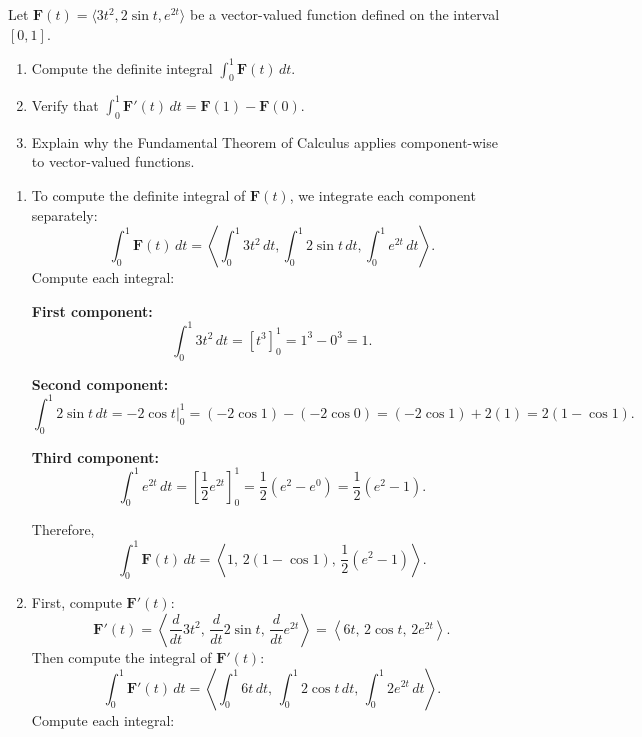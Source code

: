 \exampleline
\begin{example}
Let \(\mathbf{F}(t) = \langle 3t^2, 2\sin t, e^{2t} \rangle\) be a vector-valued function defined on the interval \( [0, 1] \).

\begin{enumerate}
    \item Compute the definite integral \(\displaystyle \int_0^1 \mathbf{F}(t) \, dt\).
    \item Verify that \(\displaystyle \int_0^1 \mathbf{F}'(t) \, dt = \mathbf{F}(1) - \mathbf{F}(0)\).
    \item Explain why the Fundamental Theorem of Calculus applies component-wise to vector-valued functions.
\end{enumerate}

\begin{solution}
\begin{enumerate}
    \item To compute the definite integral of \(\mathbf{F}(t)\), we integrate each component separately:
    \[
    \int_0^1 \mathbf{F}(t) \, dt = \left\langle \int_0^1 3t^2 \, dt, \int_0^1 2\sin t \, dt, \int_0^1 e^{2t} \, dt \right\rangle.
    \]
    Compute each integral:

    \textbf{First component:}
    \[
    \int_0^1 3t^2 \, dt = \left[ t^3 \right]_0^1 = 1^3 - 0^3 = 1.
    \]

    \textbf{Second component:}
    \[
    \int_0^1 2\sin t \, dt = -2\cos t \bigg|_0^1 = \left( -2\cos 1 \right) - \left( -2\cos 0 \right) = (-2\cos 1) + 2(1) = 2(1 - \cos 1).
    \]

    \textbf{Third component:}
    \[
    \int_0^1 e^{2t} \, dt = \left[ \frac{1}{2} e^{2t} \right]_0^1 = \frac{1}{2} \left( e^{2} - e^{0} \right) = \frac{1}{2} (e^{2} - 1).
    \]

    Therefore,
    \[
    \int_0^1 \mathbf{F}(t) \, dt = \left\langle 1, \, 2(1 - \cos 1), \, \dfrac{1}{2}(e^{2} - 1) \right\rangle.
    \]

    \item First, compute \(\mathbf{F}'(t)\):
    \[
    \mathbf{F}'(t) = \left\langle \frac{d}{dt} 3t^2, \, \frac{d}{dt} 2\sin t, \, \frac{d}{dt} e^{2t} \right\rangle = \left\langle 6t, \, 2\cos t, \, 2e^{2t} \right\rangle.
    \]
    Then compute the integral of \(\mathbf{F}'(t)\):
    \[
    \int_0^1 \mathbf{F}'(t) \, dt = \left\langle \int_0^1 6t \, dt, \, \int_0^1 2\cos t \, dt, \, \int_0^1 2e^{2t} \, dt \right\rangle.
    \]
    Compute each integral:


\end{enumerate}
\end{solution}
\end{example}
